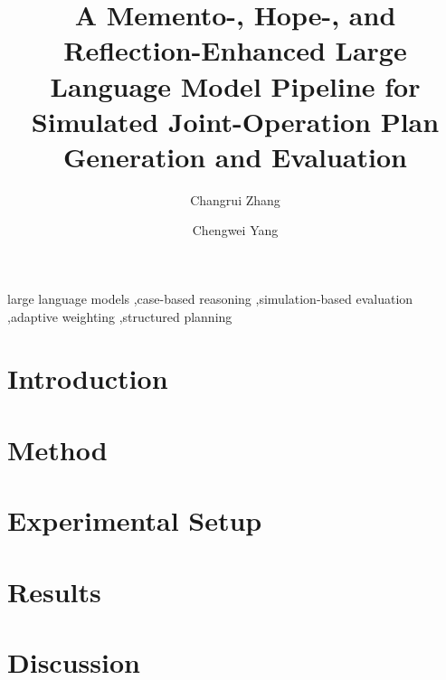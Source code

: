 \documentclass[preprint,12pt]{elsarticle}
\begin{document}
\begin{frontmatter}

\title{A Memento-, Hope-, and Reflection-Enhanced Large Language Model Pipeline for Simulated Joint-Operation Plan Generation and Evaluation}

\author[inst1]{Changrui Zhang}
\author[inst1]{Chengwei Yang}


\begin{abstract}

\end{abstract}

\begin{highlights}

\end{highlights}

\begin{keyword}
large language models \sep case-based reasoning \sep simulation-based evaluation \sep adaptive weighting \sep structured planning
\end{keyword}

\end{frontmatter}

\section{Introduction}


\section{Method}


\section{Experimental Setup}


\section{Results}
\label{sec:results}


\section{Discussion}

\end{document}
